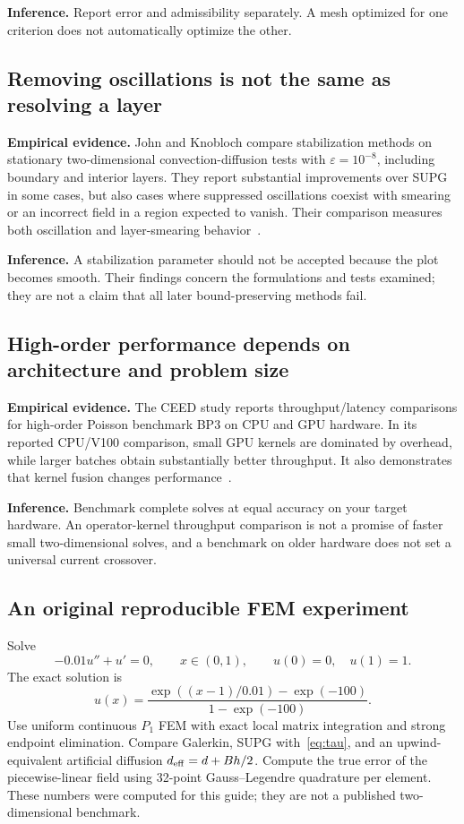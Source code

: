 \documentclass[11pt,a4paper]{article}
\newcommand{\evidence}{\textcolor{accent}{\textbf{Empirical evidence.}} }
\begin{document}
\textbf{Inference.} Report error and admissibility separately. A mesh optimized for one criterion does not automatically optimize the other.

\subsection{Removing oscillations is not the same as resolving a layer}
\evidence John and Knobloch compare stabilization methods on stationary two-dimensional convection-diffusion tests with $\varepsilon=10^{-8}$, including boundary and interior layers. They report substantial improvements over SUPG in some cases, but also cases where suppressed oscillations coexist with smearing or an incorrect field in a region expected to vanish. Their comparison measures both oscillation and layer-smearing behavior~\cite{johnknobloch}.

\textbf{Inference.} A stabilization parameter should not be accepted because the plot becomes smooth. Their findings concern the formulations and tests examined; they are not a claim that all later bound-preserving methods fail.

\subsection{High-order performance depends on architecture and problem size}
\evidence The CEED study reports throughput/latency comparisons for high-order Poisson benchmark BP3 on CPU and GPU hardware. In its reported CPU/V100 comparison, small GPU kernels are dominated by overhead, while larger batches obtain substantially better throughput. It also demonstrates that kernel fusion changes performance~\cite{ceed}.

\textbf{Inference.} Benchmark complete solves at equal accuracy on your target hardware. An operator-kernel throughput comparison is not a promise of faster small two-dimensional solves, and a benchmark on older hardware does not set a universal current crossover.

\subsection{An original reproducible FEM experiment}
Solve
\begin{equation}\label{eq:experiment}
-0.01u''+u'=0,\qquad x\in(0,1),\qquad u(0)=0,\quad u(1)=1.
\end{equation}
The exact solution is
\begin{equation}
u(x)=\frac{\exp((x-1)/0.01)-\exp(-100)}{1-\exp(-100)}.
\end{equation}
Use uniform continuous $P_1$ FEM with exact local matrix integration and strong endpoint elimination. Compare Galerkin, SUPG with~\eqref{eq:tau}, and an upwind-equivalent artificial diffusion $d_{\rm eff}=d+Bh/2$. Compute the true error of the piecewise-linear field using 32-point Gauss--Legendre quadrature per element. These numbers were computed for this guide; they are not a published two-dimensional benchmark.
\end{document}
